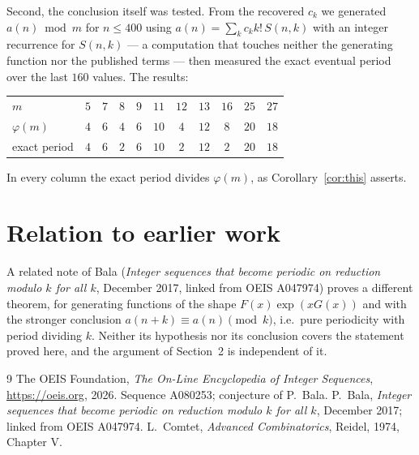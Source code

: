 \documentclass[11pt,a4paper]{article}
\theoremstyle{plain}
\theoremstyle{definition}
\begin{document}
Second, the conclusion itself was tested. From the recovered $c_{k}$ we generated
$a(n)\bmod m$ for $n\le400$ using $a(n)=\sum_{k}c_{k}k!\,S(n,k)$ with an integer
recurrence for $S(n,k)$ --- a computation that touches neither the generating function nor
the published terms --- then measured the exact eventual period over the last $160$
values. The results:

\begin{center}
\begin{tabular}{@{}lcccccccccc@{}}
\toprule
$m$  & $5$ & $7$ & $8$ & $9$ & $11$ & $12$ & $13$ & $16$ & $25$ & $27$\\
$\varphi(m)$  & $4$ & $6$ & $4$ & $6$ & $10$ & $4$ & $12$ & $8$ & $20$ & $18$\\
exact period  & $4$ & $6$ & $2$ & $6$ & $10$ & $2$ & $12$ & $2$ & $20$ & $18$\\
\bottomrule
\end{tabular}
\end{center}

\noindent
In every column the exact period divides $\varphi(m)$, as Corollary~\ref{cor:this}
asserts.

\section{Relation to earlier work}

A related note of Bala (\emph{Integer sequences that become periodic on reduction modulo
$k$ for all $k$}, December 2017, linked from OEIS A047974) proves a different theorem, for
generating functions of the shape $F(x)\exp(xG(x))$ and with the stronger conclusion
$a(n+k)\equiv a(n)\pmod{k}$, i.e.\ pure periodicity with period dividing $k$. Neither its
hypothesis nor its conclusion covers the statement proved here, and the argument of
Section~2 is independent of it.

\begin{thebibliography}{9}
 The OEIS Foundation, \emph{The On-Line Encyclopedia of Integer Sequences},
\url{https://oeis.org}, 2026. Sequence A080253; conjecture of P.\ Bala.
 P.\ Bala, \emph{Integer sequences that become periodic on reduction modulo
$k$ for all $k$}, December 2017; linked from OEIS A047974.
 L.\ Comtet, \emph{Advanced Combinatorics}, Reidel, 1974, Chapter V.
\end{thebibliography}
\end{document}
